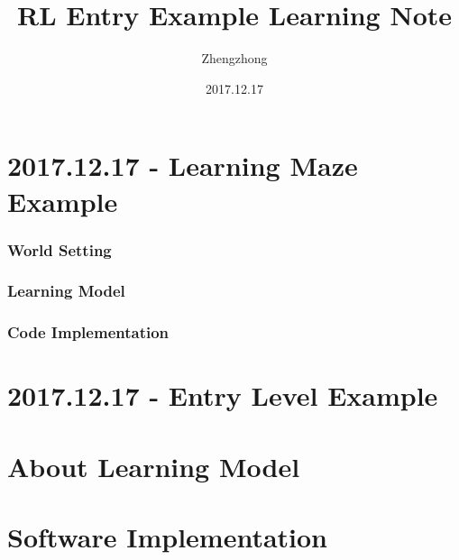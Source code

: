 \documentclass{article}
\title{RL Entry Example Learning Note}
\author{Zhengzhong}
\date{2017.12.17}
\begin{document}
\maketitle

\section{2017.12.17 - Learning Maze Example}
\subsubsection{World Setting}
\subsubsection{Learning Model}
\subsubsection{Code Implementation}




\section{2017.12.17 - Entry Level Example}
\section{About Learning Model}
\section{Software Implementation}
\end{document}
